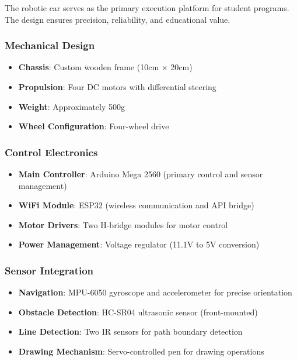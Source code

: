 The robotic car serves as the primary execution platform for student programs. The design ensures precision, reliability, and educational value.

\subsubsection{Mechanical Design}
\begin{itemize}
    \item \textbf{Chassis}: Custom wooden frame (10cm × 20cm)
    \item \textbf{Propulsion}: Four DC motors with differential steering
    \item \textbf{Weight}: Approximately 500g 
    \item \textbf{Wheel Configuration}: Four-wheel drive
\end{itemize}

\subsubsection{Control Electronics}
\begin{itemize}
    \item \textbf{Main Controller}: Arduino Mega 2560 (primary control and sensor management)
    \item \textbf{WiFi Module}: ESP32 (wireless communication and API bridge)
    \item \textbf{Motor Drivers}: Two H-bridge modules for motor control
    \item \textbf{Power Management}: Voltage regulator (11.1V to 5V conversion)
\end{itemize}

\subsubsection{Sensor Integration}
\begin{itemize}
    \item \textbf{Navigation}: MPU-6050 gyroscope and accelerometer for precise orientation
    \item \textbf{Obstacle Detection}: HC-SR04 ultrasonic sensor (front-mounted)
    \item \textbf{Line Detection}: Two IR sensors for path boundary detection
    \item \textbf{Drawing Mechanism}: Servo-controlled pen for drawing operations
\end{itemize}

